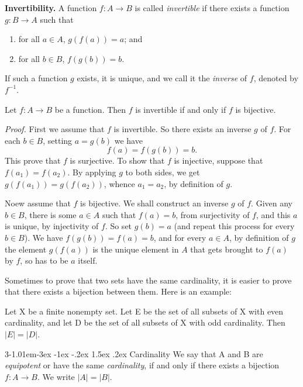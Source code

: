 \documentclass{tufte-handout}
\makeatletter
\renewcommand{\section}{\@startsection{section}%
    {3}{-1.01em}{-3ex \@plus -1ex \@minus -.2ex}%
    {1.5ex \@plus .2ex}
    {\hspace*{-5.5em}\fcolorbox{blue}{blue}{\parbox[c][1.0ex][b]{4em}{\phantom{space}}}
    \normalfont\Large\itshape\color{blue}}}
\makeatother
\begin{document}
\textbf{Invertibility.} A function \( f:A\to B \) is called \textit{invertible} if there exists a function \( g:B\to A \) such that
\begin{enumerate}
    \item for all \( a \in A \), \( g(f(a)) = a \); and
    \item for all \( b \in B \), \( f(g(b)) = b \).
\end{enumerate}
If such a function \( g \) exists, it is unique, and we call it the \textit{inverse} of \( f \), denoted by \( f^{-1} \).

\begin{Proposition}
    Let \( f:A\to B \) be a function. Then \( f \) is invertible if and only if
    \( f  \) is bijective.
\end{Proposition}

\textit{Proof.} First we assume that \( f \) is invertible. So there exists an inverse \( g  \) of \( f  \).
For each \( b \in B  \), setting \( a = g(b ) \) we have 
\[ f(a) = f(g(b)) = b. \]
This prove that \( f \) is surjective. To show that \( f \) is injective, suppose that \( f(a_1) = f(a_2) \).
By applying \( g \) to both sides, we get \(g(f(a_1)) = g(f(a_2)) \), whence \( a_1 = a_2 \), by definition of \( g \).

Noew assume that \( f \) is bijective. We shall construct an inverse \( g \) of \( f \). Given any \( b \in B \),
there is some \( a \in A \) such that \( f(a) = b \), from surjectivity of \( f \), and
this \( a \) is unique, by injectivity of \( f \). So set \( g(b) = a \) (and repeat this process for
every \( b \in B \)). We have \( f(g(b)) = f(a) = b \), and for every \( a \in A \), by definition of \( g \)
the element \( g(f(a)) \) is the unique element in \( A \) that gets brought to \( f(a) \) by \( f \), so
has to be \( a \) itself. \hfill \qedsymbol

Sometimes to prove that two sets have the same cardinality, it is easier to prove that there exists
a bijection between them. Here is an example:
\begin{Proposition}
    \label{prop:even_odd_cardinality}
    Let X be a finite nonempty set. Let E be the set of all subsets of X with even cardinality, and
    let D be the set of all subsets of X with odd cardinality. Then \( \left|E\right| = \left|D\right| \).
\end{Proposition}

\section{Cardinality}
We say that A and B are \textit{equipotent} or have the same \textit{cardinality}, 
if and only if there exists a bijection \( f:A\to B \). We write \( \left|A\right| = \left|B\right| \).
\end{document}
